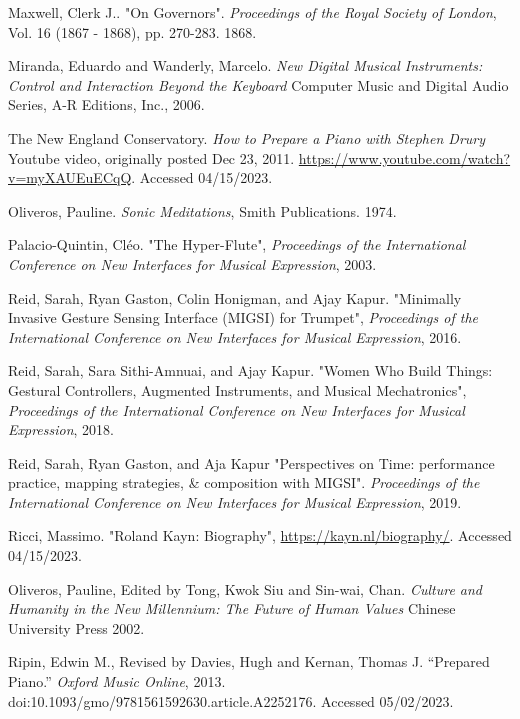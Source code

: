 \begin{thebibliography}{99}
  Maxwell, Clerk J.. "On Governors". \textit{Proceedings of the Royal Society of London}, Vol. 16 (1867 - 1868), pp. 270-283. 1868.

 Miranda, Eduardo and Wanderly, Marcelo. \emph{New Digital Musical Instruments: Control and Interaction Beyond the Keyboard} Computer Music and Digital Audio Series, A-R Editions, Inc., 2006.

 The New England Conservatory. \emph{How to Prepare a Piano with Stephen Drury} Youtube video, originally posted Dec 23, 2011. \url{https://www.youtube.com/watch?v=myXAUEuECqQ}. Accessed 04/15/2023.

 Oliveros, Pauline. \emph{Sonic Meditations}, Smith Publications. 1974.

 Palacio-Quintin, Cléo. "The Hyper-Flute", \textit{Proceedings of the International Conference on New Interfaces for Musical Expression}, 2003.

 Reid, Sarah, Ryan Gaston, Colin Honigman, and Ajay Kapur. "Minimally Invasive Gesture Sensing Interface (MIGSI) for Trumpet", \textit{Proceedings of the International Conference on New Interfaces for Musical Expression}, 2016.

 Reid, Sarah, Sara Sithi-Amnuai, and Ajay Kapur. "Women Who Build Things: Gestural Controllers, Augmented Instruments, and Musical Mechatronics", \textit{Proceedings of the International Conference on New Interfaces for Musical Expression}, 2018.

 Reid, Sarah, Ryan Gaston, and Aja Kapur "Perspectives on Time: performance practice, mapping strategies, \& composition with MIGSI". \textit{Proceedings of the International Conference on New Interfaces for Musical Expression}, 2019.

 Ricci, Massimo. "Roland Kayn: Biography", \url{https://kayn.nl/biography/}. Accessed 04/15/2023.

 Oliveros, Pauline, Edited by Tong, Kwok Siu and Sin-wai, Chan. \emph{Culture and Humanity in the New Millennium: The Future of Human Values} Chinese University Press 2002.

 Ripin, Edwin M.,  Revised by Davies, Hugh and Kernan, Thomas J. “Prepared Piano.” \textit{Oxford Music Online}, 2013. doi:10.1093/gmo/9781561592630.article.A2252176. Accessed 05/02/2023.


\end{thebibliography}
